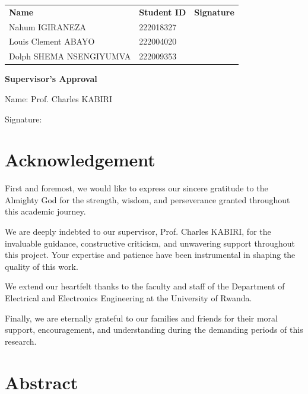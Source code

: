 \documentclass[
]{article}
\begin{document}
\vspace{01cm}

\noindent\begin{tabular}{@{}p{}p{}p{}@{}}
\textbf{Name} & \textbf{Student ID} & \textbf{Signature}\\[0.6cm]

Nahum IGIRANEZA & 222018327 & \hrulefill \\[0.7cm]

Louis Clement ABAYO & 222004020 & \hrulefill \\[0.7cm]

Dolph SHEMA NSENGIYUMVA & 222009353 & \hrulefill \\


\end{tabular}

\vspace{1cm}

\textbf{Supervisor's Approval}

\vspace{0.3cm}

Name: Prof. Charles KABIRI

\vspace{0.3cm}

Signature: \hrulefill
\clearpage

\section*{Acknowledgement}

First and foremost, we would like to express our sincere gratitude to the Almighty God for the strength, wisdom, and perseverance granted throughout this academic journey.

We are deeply indebted to our supervisor, Prof. Charles KABIRI, for the invaluable guidance, constructive criticism, and unwavering support throughout this project. Your expertise and patience have been instrumental in shaping the quality of this work.

We extend our heartfelt thanks to the faculty and staff of the Department of Electrical and Electronics Engineering at the University of Rwanda.

Finally, we are eternally grateful to our families and friends for their moral support, encouragement, and understanding during the demanding periods of this research.
\clearpage

\section*{Abstract}
\end{document}
